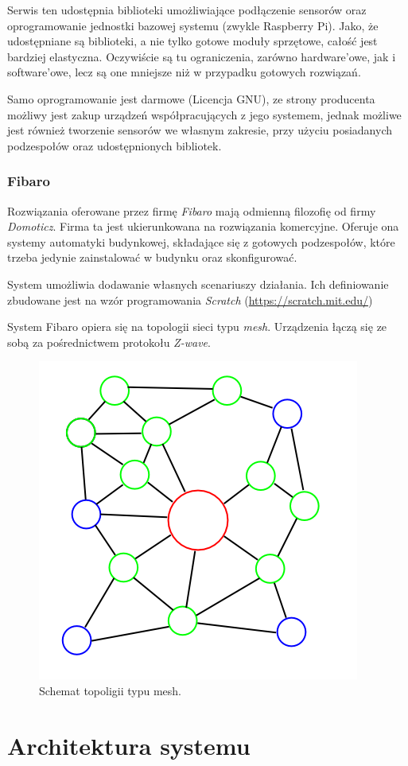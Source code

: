 \documentclass[eng,oneside]{mgr}
\begin{document}
Serwis ten udostępnia biblioteki umożliwiające podłączenie sensorów oraz oprogramowanie jednostki bazowej systemu (zwykle Raspberry Pi). Jako, że udostępniane są biblioteki, a nie tylko gotowe moduły sprzętowe, całość jest bardziej elastyczna. Oczywiście są tu ograniczenia, zarówno hardware'owe, jak i software'owe, lecz są one mniejsze niż w przypadku gotowych rozwiązań.

Samo oprogramowanie jest darmowe (Licencja GNU), ze strony producenta możliwy jest zakup urządzeń współpracujących z jego systemem, jednak możliwe jest również tworzenie sensorów we własnym zakresie, przy użyciu posiadanych podzespołów oraz udostępnionych bibliotek.
\subsection{Fibaro}                                                                                              
Rozwiązania oferowane przez firmę \textit{Fibaro} mają odmienną filozofię od firmy \textit{Domoticz}. Firma ta jest ukierunkowana na rozwiązania komercyjne. Oferuje ona systemy automatyki budynkowej, składające się z gotowych podzespołów, które trzeba jedynie zainstalować w budynku oraz skonfigurować.

System umożliwia dodawanie własnych scenariuszy działania. Ich definiowanie zbudowane jest na wzór programowania \textit{Scratch} (\url{https://scratch.mit.edu/})

System Fibaro opiera się na topologii sieci typu \textit{mesh}. Urządzenia łączą się ze sobą za pośrednictwem protokołu \textit{Z-wave}.
\begin{figure}[h]
\centering
\includegraphics[width=0.4\linewidth]{mesh}
\caption{Schemat topoligii typu mesh.}
\label{fig:Mesh-Network}
\end{figure}

\chapter{Architektura systemu}
\end{document}
